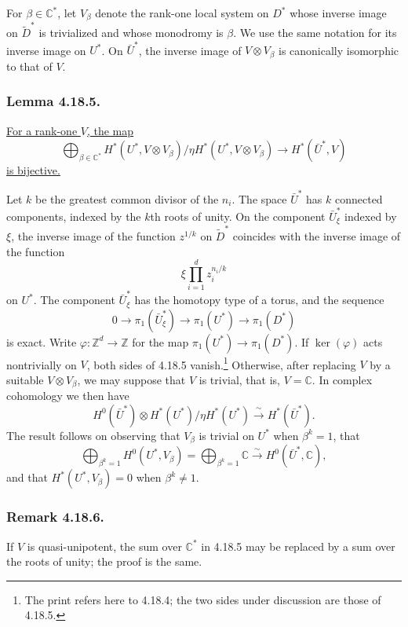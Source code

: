 For $\beta\in\mathbb C^*$, let $V_\beta$ denote the rank-one local
system on $D^*$ whose inverse image on $\widetilde D^*$ is
trivialized and whose monodromy is $\beta$.  We use the same notation
for its inverse image on $U^*$.  On $\bar U^*$, the inverse image of
$V\otimes V_\beta$ is canonically isomorphic to that of $V$.

\subsubsection*{Lemma 4.18.5.}
\underline{For a rank-one $V$, the map}
\[
\bigoplus_{\beta\in\mathbb C^*}
H^*(U^*,V\otimes V_\beta)/
 \eta H^*(U^*,V\otimes V_\beta)
\longrightarrow H^*(\bar U^*,V)
\]
\underline{is bijective.}

Let $k$ be the greatest common divisor of the $n_i$.  The space
$\bar U^*$ has $k$ connected components, indexed by the $k$th roots
of unity.  On the component $\bar U_\xi^*$ indexed by $\xi$, the
inverse image of the function $z^{1/k}$ on $\widetilde D^*$
coincides with the inverse image of the function
\[
\xi\prod_{i=1}^d z_i^{n_i/k}
\]
on $U^*$.  The component $\bar U_\xi^*$ has the homotopy type of a
torus, and the sequence
\[
0\longrightarrow\pi_1(\bar U_\xi^*)
 \longrightarrow\pi_1(U^*)\longrightarrow\pi_1(D^*)
\]
is exact.  Write $\varphi:\mathbb Z^d\to\mathbb Z$ for the map
$\pi_1(U^*)\to\pi_1(D^*)$.  If $\ker(\varphi)$ acts nontrivially on
$V$, both sides of 4.18.5 vanish.\footnote{The print refers here to
4.18.4; the two sides under discussion are those of 4.18.5.}
Otherwise, after replacing $V$ by a suitable $V\otimes V_\beta$, we
may suppose that $V$ is trivial, that is, $V=\mathbb C$.  In complex
cohomology we then have
\[
H^0(\bar U^*)\otimes
 H^*(U^*)/\eta H^*(U^*)
 \xrightarrow{\ \sim\ }H^*(\bar U^*).
\]
The result follows on observing that $V_\beta$ is trivial on $U^*$
when $\beta^k=1$, that
\[
\bigoplus_{\beta^k=1}H^0(U^*,V_\beta)
=\bigoplus_{\beta^k=1}\mathbb C
 \xrightarrow{\ \sim\ }H^0(\bar U^*,\mathbb C),
\]
and that $H^*(U^*,V_\beta)=0$ when $\beta^k\ne1$.

\subsubsection*{Remark 4.18.6.}
If $V$ is quasi-unipotent, the sum over $\mathbb C^*$ in 4.18.5 may
be replaced by a sum over the roots of unity; the proof is the same.

